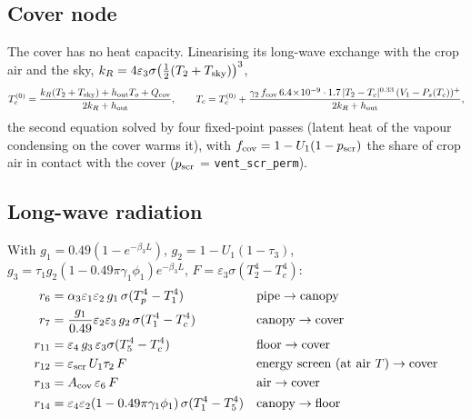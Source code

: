 \documentclass[11pt,a4paper]{article}
\newcommand{\code}[1]{\texttt{#1}}
\begin{document}
\subsection{Cover node}\label{sec:cover}
The cover has no heat capacity. Linearising its long-wave exchange with the crop air and the sky,
$k_R=4\varepsilon_3\sigma\bigl(\tfrac12(T_2+T_{\rm sky})\bigr)^3$,
\begin{equation}
T_c^{(0)}=\frac{k_R(T_2+T_{\rm sky})+h_{\rm out}T_o+Q_{\rm cov}}{2k_R+h_{\rm out}},\qquad
T_c=T_c^{(0)}+\frac{\gamma_2\,f_{\rm cov}\,6.4\!\times\!10^{-9}\cdot1.7\,|T_2-T_c|^{0.33}\,(V_1-P_s(T_c))^+}{2k_R+h_{\rm out}},
\end{equation}
the second equation solved by four fixed-point passes (latent heat of the vapour condensing on the cover warms it), with
$f_{\rm cov}=1-U_1(1-p_{\rm scr})$ the share of crop air in contact with the cover ($p_{\rm scr}$ = \code{vent\_scr\_perm}).

\subsection{Long-wave radiation}\label{sec:lw}
With $g_1=0.49(1-e^{-\beta_3L})$, $g_2=1-U_1(1-\tau_3)$, $g_3=\tau_1g_2(1-0.49\pi\gamma_1\phi_1)e^{-\beta_3L}$,
$F=\varepsilon_3\sigma(T_2^4-T_c^4)$:
\begin{align}
r_6&=\alpha_3\varepsilon_1\varepsilon_2\,g_1\,\sigma(T_p^4-T_1^4) &&\text{pipe}\to\text{canopy}\\
r_7&=\frac{g_1}{0.49}\varepsilon_2\varepsilon_3\,g_2\,\sigma(T_1^4-T_c^4) &&\text{canopy}\to\text{cover}\\
r_{11}&=\varepsilon_4\,g_3\,\varepsilon_3\sigma(T_5^4-T_c^4) &&\text{floor}\to\text{cover}\\
r_{12}&=\varepsilon_{\rm scr}\,U_1\tau_2\,F &&\text{energy screen (at air }T)\to\text{cover}\\
r_{13}&=A_{\rm cov}\,\varepsilon_6\,F &&\text{air}\to\text{cover}\\
r_{14}&=\varepsilon_4\varepsilon_2(1-0.49\pi\gamma_1\phi_1)\,\sigma(T_1^4-T_5^4) &&\text{canopy}\to\text{floor}
\end{align}
\end{document}

